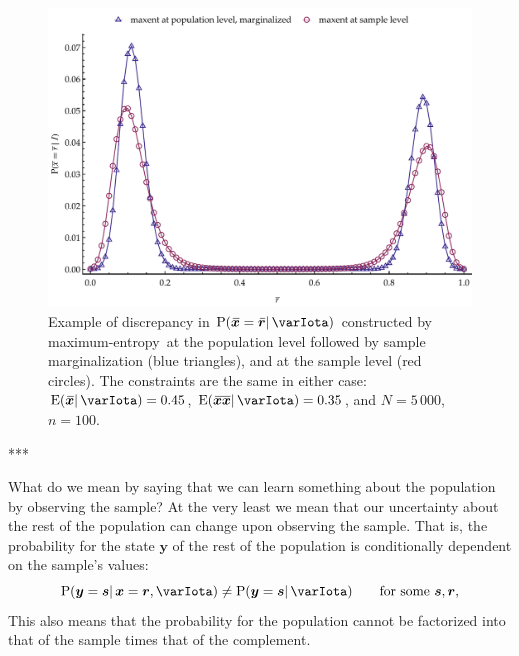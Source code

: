 \documentclass{article}
\makeatletter
\theoremstyle{remark}
\theoremstyle{innote}
\def\sum{\DOTSI\sumop\slimits@}
\renewcommand*{\|}{\mathpunct{|}}%
\newcommand*{\p}{\mathrm{P}}%
\newcommand*{\E}{\mathrm{E}}
\DeclarePairedDelimiter\expp{(}{)}
\newcommand*{\expe}{\E\expp}%
\theoremstyle{simple}
\newcommand*{\widebar}[1]{{\mkern1.5mu\skew{2}\overline{\mkern-1.5mu#1\mkern-1.5mu}\mkern 1.5mu}}
\newcommand*{\av}{\widebar} %
\newcommand*{\sav}{\widebar} %
\newcommand*{\yxx}{x}%
\newcommand*{\yx}{\bm{\yxx}}%
\newcommand*{\yxs}{\sav{\yx}}%
\newcommand*{\yX}{\bm{X}}%
\newcommand*{\yy}{\bm{y}}%
\newcommand*{\yxxs}{\sav{\yx\yx}}%
\newcommand*{\yr}{\bm{r}}%
\newcommand*{\ys}{\bm{s}}%
\newcommand*{\yrs}{\sav{\yr}}%
\newcommand*{\yH}{\varIota}
\newcommand*{\me}{maximum-entropy}
\makeatother
\begin{document}
\begin{figure}[!t]
\centering
\includegraphics[width=0.95\columnwidth]{different_maxent_pop_sample_100.pdf}%
\caption{Example of discrepancy in $\p(\yxs = \yrs \| \yH)$ constructed by
  \me\ at the population level followed by sample marginalization (blue
  triangles), and at the sample level (red circles). The constraints are
  the same in either case: $\expe{\yxs \|\yH}=0.45$,
  $\expe{\yxxs \|\yH}=0.35$, and $N=5\,000$, $n=100$.}
\label{fig:diff_maxent_pop_sample}
\end{figure}%

***


What do we mean by saying that we can learn something about the population
by observing the sample? At the very least we mean that our uncertainty
about the rest of the population can change upon observing the sample. That
is, the probability for the state $\yy$ of the rest of the population is
conditionally dependent on the sample's values:
\begin{equation}
  \label{eq:conditionally_dependent_sample}
  \p(\yy =\ys \| \yx=\yr,\yH) \ne \p(\yy =\ys \|\yH)
  \qquad\text{for some $\ys,\yr$},
\end{equation}
This also means that the probability for the population cannot be
factorized into that of the sample times that of the complement.
\end{document}
